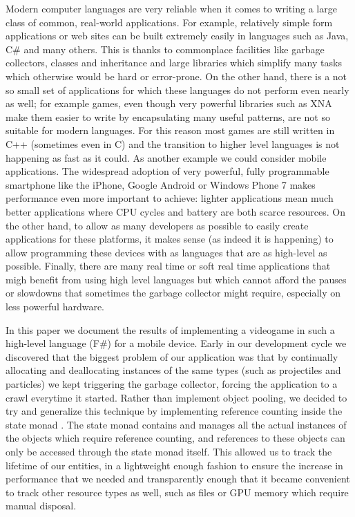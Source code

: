 Modern computer languages are very reliable when it comes to writing a large class of common, real-world applications. For example, relatively simple form applications or web sites can be built extremely easily in languages such as Java, C\# and many others. This is thanks to commonplace facilities like garbage collectors, classes and inheritance and large libraries which simplify many tasks which otherwise would be hard or error-prone. On the other hand, there is a not so small set of applications for which these languages do not perform even nearly as well; for example games, even though very powerful libraries such as XNA make them easier to write by encapsulating many useful patterns, are not so suitable for modern languages. For this reason most games are still written in C++ (sometimes even in C) and the transition to higher level languages is not happening as fast as it could. As another example we could consider mobile applications. The widespread adoption of very powerful, fully programmable smartphone like the iPhone, Google Android or Windows Phone 7 makes performance even more important to achieve: lighter applications mean much better applications where CPU cycles and battery are both scarce resources. On the other hand, to allow as many developers as possible to easily create applications for these platforms, it makes sense (as indeed it is happening) to allow programming these devices with as languages that are as high-level as possible. Finally, there are many real time or soft real time applications that migh benefit from using high level languages but which cannot afford the pauses or slowdowns that sometimes the garbage collector might require, especially on less powerful hardware.


In this paper we document the results of implementing a videogame in such a high-level language (F\#) for a mobile device. Early in our development cycle we discovered that the biggest problem of our application was that by continually allocating and deallocating instances of the same types (such as projectiles and particles) we kept triggering the garbage collector, forcing the application to a crawl everytime it started. Rather than implement object pooling, we decided to try and generalize this technique by implementing reference counting \cite{7_6} inside the state monad \cite{1_1}. The state monad contains and manages all the actual instances of the objects which require reference counting, and references to these objects can only be accessed through the state monad itself. This allowed us to track the lifetime of our entities, in a lightweight enough fashion to ensure the increase in performance that we needed and transparently enough that it became convenient to track other resource types as well, such as files or GPU memory which require manual disposal.


